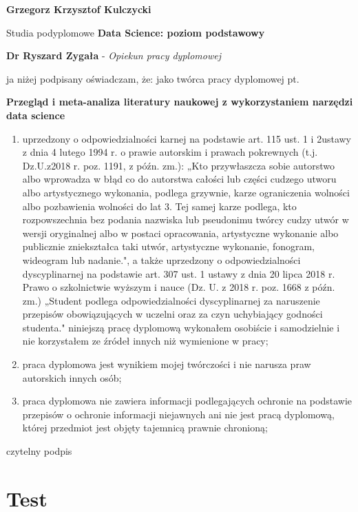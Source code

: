 \documentclass[
  12pt,
]{article}
\begin{document}
\textbf{Grzegorz Krzysztof Kulczycki}

Studia podyplomowe \textbf{Data Science: poziom podstawowy}

\textbf{Dr Ryszard Zygała} - \textit {Opiekun pracy dyplomowej}

ja niżej podpisany oświadczam, że: jako twórca pracy dyplomowej pt.

\textbf{Przegląd i meta-analiza literatury naukowej z wykorzystaniem narzędzi data science}

\small
\begin{enumerate}
\item uprzedzony o odpowiedzialności karnej na podstawie art. 115 ust. 1 i 2ustawy z dnia 4 lutego 1994 r. o prawie autorskim i prawach pokrewnych (t.j. Dz.U.z2018 r. poz. 1191, z późn. zm.): „Kto przywłaszcza sobie autorstwo albo wprowadza w błąd co do autorstwa całości lub części cudzego utworu albo artystycznego wykonania, podlega grzywnie, karze ograniczenia wolności albo pozbawienia wolności do lat 3. Tej samej karze podlega, kto rozpowszechnia bez podania nazwiska lub pseudonimu twórcy cudzy utwór w wersji oryginalnej albo w postaci opracowania, artystyczne wykonanie albo publicznie zniekształca taki utwór, artystyczne wykonanie, fonogram, wideogram lub nadanie.", a także uprzedzony o odpowiedzialności dyscyplinarnej na podstawie art. 307 ust. 1 ustawy z dnia 20 lipca 2018 r. Prawo o szkolnictwie wyższym i nauce (Dz. U. z 2018 r. poz. 1668 z późn. zm.) „Student podlega odpowiedzialności dyscyplinarnej za naruszenie przepisów obowiązujących w uczelni oraz za czyn uchybiający godności studenta." niniejszą pracę dyplomową wykonałem osobiście i samodzielnie i nie korzystałem ze źródeł innych niż wymienione w pracy;

\item praca dyplomowa jest wynikiem mojej twórczości i nie narusza praw autorskich innych osób;

\item praca dyplomowa nie zawiera informacji podlegających ochronie na podstawie przepisów o ochronie informacji niejawnych ani nie jest pracą dyplomową, której przedmiot jest objęty tajemnicą prawnie chronioną;
\end{enumerate}

\vspace{0.5 cm}

czytelny podpis

\FloatBarrier
\newpage
{}

\hypertarget{test}{%
\section{\texorpdfstring{Test\label{label1}}{Test}}\label{test}}
\end{document}
